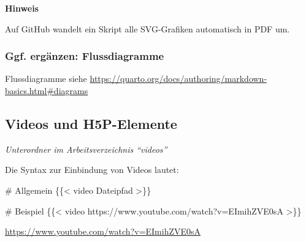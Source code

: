 \documentclass[
  letterpaper,
  DIV=11]{scrartcl}
\newenvironment{Shaded}{\begin{snugshade}}{\end{snugshade}}
\newcommand{\NormalTok}[1]{\textcolor[rgb]{0.00,0.23,0.31}{#1}}
\providecommand{\tightlist}{%
  \setlength{\itemsep}{0pt}\setlength{\parskip}{0pt}}\usepackage{longtable,booktabs,array}
\begin{document}
\begin{tcolorbox}[enhanced jigsaw, breakable, rightrule=.15mm, leftrule=.75mm, opacityback=0, colframe=quarto-callout-warning-color-frame, toprule=.15mm, left=2mm, colback=white, arc=.35mm, bottomrule=.15mm]
\begin{minipage}[t]{5.5mm}
\textcolor{quarto-callout-warning-color}{\faExclamationTriangle}
\end{minipage}%
\begin{minipage}[t]{\textwidth - 5.5mm}

\vspace{-3mm}\textbf{Hinweis}\vspace{3mm}

Auf GitHub wandelt ein Skript alle SVG-Grafiken automatisch in PDF um.

\end{minipage}%
\end{tcolorbox}

\subsubsection{Ggf. ergänzen:
Flussdiagramme}\label{ggf.-erguxe4nzen-flussdiagramme}

Flussdiagramme siehe
\url{https://quarto.org/docs/authoring/markdown-basics.html\#diagrams}

\subsection{Videos und H5P-Elemente}\label{videos-und-h5p-elemente}

\begin{description}
\tightlist
\item[Speicherort von Videos]
\emph{Unterordner im Arbeitsverzeichnis ``videos''}
\end{description}

Die Syntax zur Einbindung von Videos lautet:

\begin{Shaded}
\begin{Highlighting}[]
\NormalTok{\# Allgemein}
\NormalTok{\{\{\textless{} video Dateipfad \textgreater{}\}\}}

\NormalTok{\# Beispiel}
\NormalTok{\{\{\textless{} video https://www.youtube.com/watch?v=EImihZVE0sA \textgreater{}\}\}}
\end{Highlighting}
\end{Shaded}

\url{https://www.youtube.com/watch?v=EImihZVE0sA}
\end{document}
